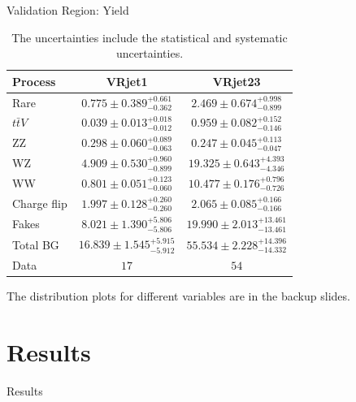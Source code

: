 \documentclass[mathserif,serif]{beamer}
\begin{document}
\begin{frame}{Validation Region: Yield}
\begin{table}
\begin{center}
\begin{tabular}{|l|c|c|}
\hline
\hline
Process & VRjet1 & VRjet23 \\
\hline
\hline
Rare        & $0.775\pm 0.389^{+0.661}_{-0.362}$ & $2.469 \pm 0.674^{+0.998} _{-0.899}$ \\
$t\bar{t}V$ & $0.039\pm 0.013^{+0.018}_{-0.012}$ & $0.959 \pm 0.082^{+0.152} _{-0.146}$ \\
ZZ          & $0.298\pm 0.060^{+0.089}_{-0.063}$ & $0.247 \pm 0.045^{+0.113} _{-0.047}$ \\
WZ          & $4.909\pm 0.530^{+0.960}_{-0.899}$ & $19.325\pm 0.643^{+4.393} _{-4.346}$ \\
WW          & $0.801\pm 0.051^{+0.123}_{-0.060}$ & $10.477\pm 0.176^{+0.796} _{-0.726}$ \\
Charge flip & $1.997\pm 0.128^{+0.260}_{-0.260}$ & $2.065 \pm 0.085^{+0.166} _{-0.166}$ \\
Fakes       & $8.021\pm 1.390^{+5.806}_{-5.806}$ & $19.990\pm 2.013^{+13.461}_{-13.461}$ \\
\hline
Total BG      & $16.839\pm 1.545^{+5.915}_{-5.912}$ & $55.534\pm 2.228^{+14.396}_{-14.332}$ \\
\hline
\hline
Data        & $17$ & $54$ \\
\hline
\hline
\end{tabular}
\caption{The uncertainties include the statistical and systematic uncertainties.}
\label{tab:VR_yields}
\end{center}
\end{table}
The distribution plots for different variables are in the backup slides.
\end{frame}

\section{Results}
\begin{frame}
\begin{center}
\huge
Results
\end{center}
\end{frame}
\end{document}
